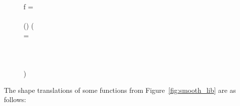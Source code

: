 \begin{figure}[H]
\hfill\begin{minipage}{.75\textwidth}\raggedright
f = 
\\
\tabt {}
\\
\tabt \vallocterm{} () (
\\
\tabt \tabt {}  =
\\
\tabt \tabt \tabt 
{}   
\\
\tabt \tabt \tabt \tabt \tabt {}  
\\
\tabt \tabt 
{}   
\\
\tabt )
\end{minipage}\hfill
\end{figure}

The shape translations of some \lafsharp{} functions from Figure~\ref{fig:smooth_lib} are as follows:

